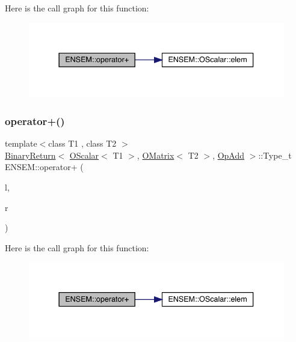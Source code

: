 Here is the call graph for this function\+:\nopagebreak
\begin{figure}[H]
\begin{center}
\leavevmode
\includegraphics[width=337pt]{d8/d55/group__obsmatrix_ga594575d5bb0ce31fd07e9fb29fd9c8ac_cgraph}
\end{center}
\end{figure}
\mbox{\label{group__obsmatrix_ga6cdb2a903fbc9f5a836a442a81275a56}} 
\subsubsection{\texorpdfstring{operator+()}{operator+()}\hspace{0.1cm}{\footnotesize\ttfamily [4/4]}}
{\footnotesize\ttfamily template$<$class T1 , class T2 $>$ \\
\mbox{\hyperlink{structENSEM_1_1BinaryReturn}{Binary\+Return}}$<$ \mbox{\hyperlink{classENSEM_1_1OScalar}{O\+Scalar}}$<$ T1 $>$, \mbox{\hyperlink{classENSEM_1_1OMatrix}{O\+Matrix}}$<$ T2 $>$, \mbox{\hyperlink{structENSEM_1_1OpAdd}{Op\+Add}} $>$\+::Type\+\_\+t E\+N\+S\+E\+M\+::operator+ (\begin{DoxyParamCaption}\item[{const \mbox{\hyperlink{classENSEM_1_1OScalar}{O\+Scalar}}$<$ T1 $>$ \&}]{l,  }\item[{const \mbox{\hyperlink{classENSEM_1_1OMatrix}{O\+Matrix}}$<$ T2 $>$ \&}]{r }\end{DoxyParamCaption})\hspace{0.3cm}{\ttfamily [inline]}}

Here is the call graph for this function\+:\nopagebreak
\begin{figure}[H]
\begin{center}
\leavevmode
\includegraphics[width=337pt]{d8/d55/group__obsmatrix_ga6cdb2a903fbc9f5a836a442a81275a56_cgraph}
\end{center}
\end{figure}
\mbox{\label{group__obsmatrix_gaf8abde7e3428822593f11a4317f48880}} 
